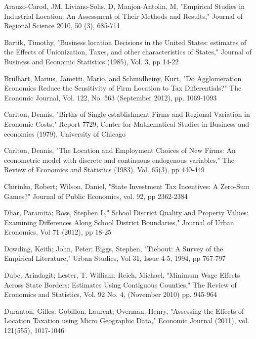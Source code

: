 \documentclass[12pt,a4paper]{article}
\begin{document}
\newpage
\begin{thebibliography}{99}

Arauzo-Carod, JM, Liviano-Solis, D, Manjon-Antolin, M, "Empirical Studies in Industrial Location: An Assessment of Their Methods and Results," Journal of Regional Science 2010, 50 (3), 685-711

Bartik, Timothy, "Business location Decisions in the United States: estimates of the Effects of Unionization, Taxes, and other characteristics of States," Journal of Business and Economic Statistics (1985), Vol. 3, pp 14-22

Brülhart, Marius, Jametti, Mario, and Schmidheiny, Kurt, "Do Agglomeration Economics Reduce the Sensitivity of Firm Location to Tax Differentials?" The Economic Journal, Vol. 122, No. 563 (September 2012), pp. 1069-1093

Carlton, Dennis, "Births of Single establishment Firms and Regional Variation in Economic Costs," Report 7729, Center for Mathematical Studies in Business and economics (1979), University of Chicago

Carlton, Dennis, "The Location and Employment Choices of New Firms: An econometric model with discrete and continuous endogenous variables," The Review of Economics and Statistics (1983), Vol. 65(3), pp 440-449

Chirinko, Robert; Wilson, Daniel, "State Investment Tax Incentives: A Zero-Sum Games?" Journal of Public Economics, vol. 92, pp 2362-2384

Dhar, Paramita; Ross, Stephen L," School Discrict Quality and Property Values: Examining Differences Along School District Boundaries," Journal of Urban Economics, Vol 71 (2012), pp 18-25

Dowding, Keith; John, Peter; Biggs, Stephen, "Tiebout: A Survey of the Empirical Literature," Urban Studies, Vol 31, Issue 4-5, 1994, pp 767-797

Dube, Arindagit; Lester, T. William; Reich, Michael, "Minimum Wage Effects Across State Borders: Estimates Using Contiguous Counties," The Review of Economics and Statistics, Vol. 92 No. 4, (November 2010) pp. 945-964

Duranton, Gilles; Gobillon, Laurent; Overman, Henry, "Assessing the Effects of Location Taxation using Micro Geographic Data," Economic Journal (2011), vol. 121(555), 1017-1046



\end{thebibliography}
\end{document}
